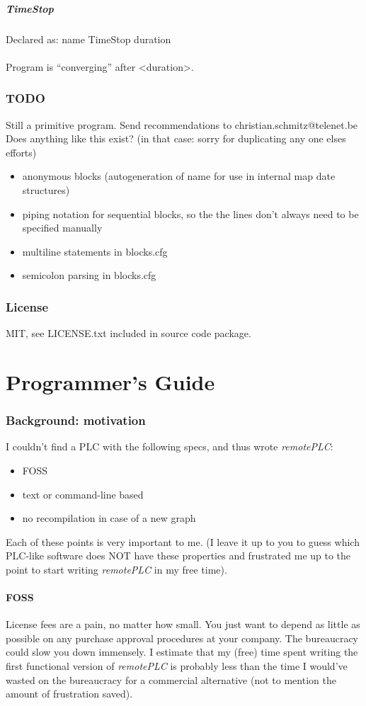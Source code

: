 \documentclass[a4paper]{article}
\begin{document}
\subsubsection{TimeStop}
Declared as: name TimeStop duration\\\\
Program is ``converging'' after <duration>.
\section{TODO}
Still a primitive program. Send recommendations to christian.schmitz@telenet.be
Does anything like this exist? (in that case: sorry for duplicating any one elses efforts)
\begin{itemize}
  \item anonymous blocks (autogeneration of name for use in internal map date structures)
  \item piping notation for sequential blocks, so the the lines don't always need to be specified manually
  \item multiline statements in blocks.cfg
  \item semicolon parsing in blocks.cfg
\end{itemize}
\section{License}
MIT, see LICENSE.txt included in source code package.
\part{Programmer's Guide}
\section{Background: motivation}
I couldn't find a PLC with the following specs, and thus wrote \textit{remotePLC}:
\begin{itemize}
  \item FOSS
  \item text or command-line based
  \item no recompilation in case of a new graph
\end{itemize}
Each of these points is very important to me. (I leave it up to you to guess which PLC-like software does NOT have these properties and frustrated me up to the point to start writing \textit{remotePLC} in my free time).
\subsection{FOSS}
License fees are a pain, no matter how small. You just want to depend as little as possible on any purchase approval procedures at your company. The bureaucracy could slow you down immensely. I estimate that my (free) time spent writing the first functional version of \textit{remotePLC} is probably less than the time I would've wasted on the bureaucracy for a commercial alternative (not to mention the amount of frustration saved).
\end{document}
